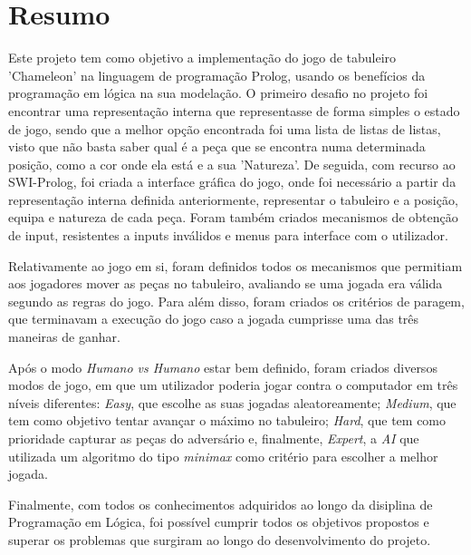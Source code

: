 \documentclass[a4paper]{article}
\begin{document}

\newpage

\section*{Resumo}
Este projeto tem como objetivo a implementação do jogo de tabuleiro 'Chameleon' na linguagem de programação Prolog, usando os benefícios da programação em lógica na sua modelação.
O primeiro desafio no projeto foi encontrar uma representação interna que representasse de forma simples o estado de jogo, sendo que a melhor opção encontrada foi uma lista de listas de listas, visto que não basta saber qual é a peça que se encontra numa determinada posição, como a cor onde ela está e a sua 'Natureza'.
De seguida, com recurso ao SWI-Prolog, foi criada a interface gráfica do jogo, onde foi necessário a partir da representação interna definida anteriormente, representar o tabuleiro e a posição, equipa e natureza de cada peça. Foram também criados mecanismos de obtenção de input, resistentes a inputs inválidos e menus para interface com o utilizador.

Relativamente ao jogo em si, foram definidos todos os mecanismos que permitiam aos jogadores mover as peças no tabuleiro, avaliando se uma jogada era válida segundo as regras do jogo. Para além disso, foram criados os critérios de paragem, que terminavam a execução do jogo caso a jogada cumprisse uma das três maneiras de ganhar.

Após o modo \textit{Humano vs Humano} estar bem definido, foram criados diversos modos de jogo, em que um utilizador poderia jogar contra o computador em três níveis diferentes: \textit{Easy}, que escolhe as suas jogadas aleatoreamente; \textit{Medium}, que tem como objetivo tentar avançar o máximo no tabuleiro; \textit{Hard}, que tem como prioridade capturar as peças do adversário e, finalmente, \textit{Expert}, a \textit{AI} que utilizada um algoritmo do tipo \textit{minimax} como critério para escolher a melhor jogada.

Finalmente, com todos os conhecimentos adquiridos ao longo da disiplina de Programação em Lógica, foi possível cumprir todos os objetivos propostos e superar os problemas que surgiram ao longo do desenvolvimento do projeto.

\newpage 
\end{document}
